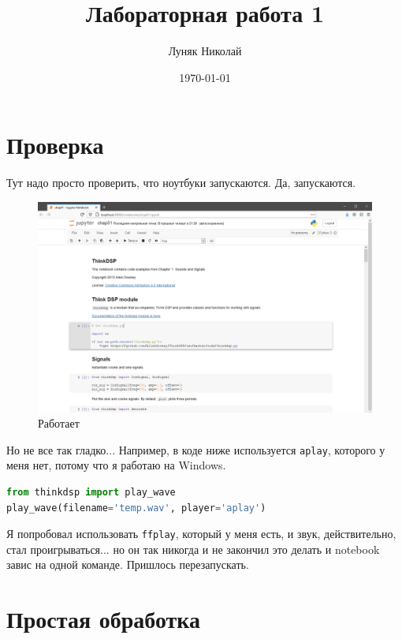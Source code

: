 \documentclass[a4paper,12pt]{report}
\author{Луняк Николай}
\title{Лабораторная работа 1}
\date{\today}
\begin{document}
    \maketitle
    \tableofcontents
    \listoffigures
    \lstlistoflistings
    
    \chapter{Проверка}
    
    Тут надо просто проверить, что ноутбуки запускаются. Да, запускаются.
    
    \begin{figure}[H]
        \centering
        \includegraphics[width=\textwidth]{ex1_it_works.png}
        \caption{Работает}
        \label{fig:ex1_it_works}
    \end{figure}
    
    Но не все так гладко... Например, в коде ниже используется \texttt{aplay}, которого у меня нет, потому что я работаю на Windows.
    
\begin{lstlisting}[language=Python,caption=Использование \texttt{aplay}]
from thinkdsp import play_wave
play_wave(filename='temp.wav', player='aplay')
\end{lstlisting}
    
    Я попробовал использовать \texttt{ffplay}, который у меня есть, и звук, действительно, стал проигрываться... но он так никогда и не закончил это делать и notebook завис на одной команде. Пришлось перезапускать.
    
    \chapter{Простая обработка}
\end{document}
